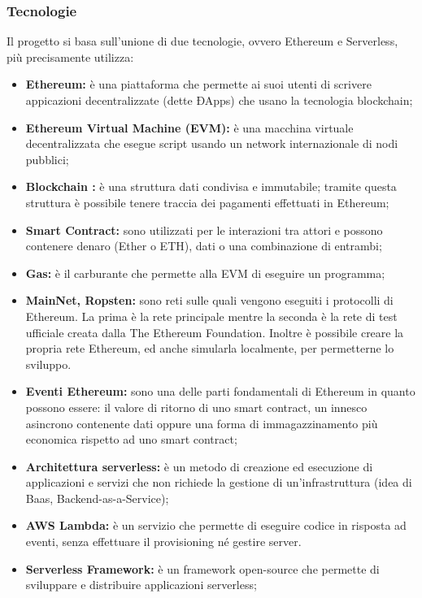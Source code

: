     \subsubsection{Tecnologie}
     Il progetto si basa sull'unione di due tecnologie, ovvero Ethereum e Serverless, più precisamente utilizza:
     \begin{itemize}
    		\item \textbf{Ethereum: }è una piattaforma che permette ai suoi utenti di scrivere appicazioni decentralizzate (dette ÐApps) che usano la tecnologia blockchain;
    		\item \textbf{Ethereum Virtual Machine (EVM): }è una macchina virtuale decentralizzata che esegue script usando un network internazionale di nodi pubblici;
    		\item \textbf{Blockchain : }è una struttura dati condivisa e immutabile;  tramite questa struttura è possibile tenere traccia dei pagamenti effettuati in Ethereum;
    		\item \textbf{Smart Contract: }sono utilizzati per le interazioni tra attori e possono contenere denaro (Ether o ETH), dati o una combinazione di entrambi;
    		\item \textbf{Gas: }è il carburante che permette alla EVM di eseguire un programma;
    		 \item \textbf{MainNet, Ropsten: }sono reti sulle quali vengono eseguiti i protocolli di Ethereum. La prima è la rete principale mentre la seconda è la rete di test ufficiale creata dalla The Ethereum Foundation. Inoltre è possibile creare la propria rete Ethereum, ed anche simularla localmente, per permetterne lo sviluppo.
    		 \item \textbf{Eventi Ethereum: }sono una delle parti fondamentali di Ethereum in quanto possono essere: il  valore di ritorno di uno smart contract,  un innesco asincrono contenente dati oppure una forma di  immagazzinamento più economica rispetto ad uno smart contract;
    		 \item \textbf{Architettura serverless: }è un metodo di creazione ed esecuzione di applicazioni e servizi che non richiede la gestione di un'infrastruttura (idea di Baas, Backend-as-a-Service);
    		 \item \textbf{AWS Lambda: }è un servizio che permette di eseguire codice  in risposta ad eventi, senza effettuare il provisioning né gestire server.
    		 \item \textbf{Serverless Framework: }è un framework open-source che permette di sviluppare e distribuire applicazioni serverless;

\end{itemize}
